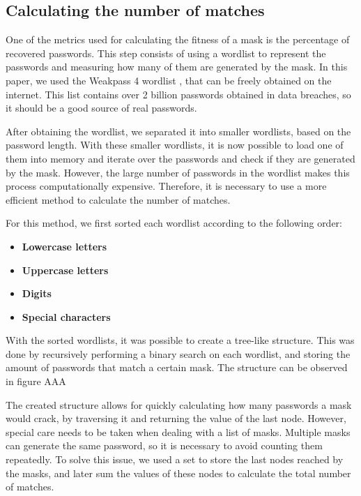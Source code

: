 \documentclass[sigconf,authordraft]{acmart}
\begin{document}
\subsection{Calculating the number of matches}

One of the metrics used for calculating the fitness of a mask is the percentage of recovered passwords.
This step consists of using a wordlist to represent the passwords and measuring how many of them are generated by the mask.
In this paper, we used the Weakpass 4 wordlist \cite{weakpass4}, that can be freely obtained on the internet.
This list contains over 2 billion passwords obtained in data breaches, so it should be a good source of real passwords.

After obtaining the wordlist, we separated it into smaller wordlists, based on the password length.
With these smaller wordlists, it is now possible to load one of them into memory and iterate over the passwords and check if they are generated by the mask.
However, the large number of passwords in the wordlist makes this process computationally expensive.
Therefore, it is necessary to use a more efficient method to calculate the number of matches.

For this method, we first sorted each wordlist according to the following order:

\begin{itemize}
  \item \textbf{Lowercase letters}
  \item \textbf{Uppercase letters}
  \item \textbf{Digits}
  \item \textbf{Special characters}
\end{itemize}

With the sorted wordlists, it was possible to create a tree-like structure.
This was done by recursively performing a binary search on each wordlist, and storing the amount of passwords that match a certain mask.
The structure can be observed in figure AAA

The created structure allows for quickly calculating how many passwords a mask would crack, by traversing it and returning the value of the last node.
However, special care needs to be taken when dealing with a list of masks.
Multiple masks can generate the same password, so it is necessary to avoid counting them repeatedly.
To solve this issue, we used a set to store the last nodes reached by the masks, and later sum the values of these nodes to calculate the total number of matches.
\end{document}
